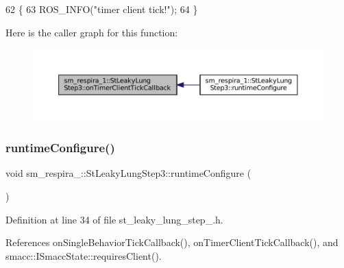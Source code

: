 \begin{DoxyCode}
62     \{
63         ROS\_INFO(\textcolor{stringliteral}{"timer client tick!"});
64     \}
\end{DoxyCode}
Here is the caller graph for this function\+:
\nopagebreak
\begin{figure}[H]
\begin{center}
\leavevmode
\includegraphics[width=350pt]{structsm__respira__1_1_1StLeakyLungStep3_aba1b3c5760856cfc92389b526650a189_icgraph}
\end{center}
\end{figure}
\mbox{\label{structsm__respira__1_1_1StLeakyLungStep3_abea67094aaff8b69c96f478914165c8f}} 
\subsubsection{\texorpdfstring{runtime\+Configure()}{runtimeConfigure()}}
{\footnotesize\ttfamily void sm\+\_\+respira\+\_\+::\+St\+Leaky\+Lung\+Step3\+::runtime\+Configure (\begin{DoxyParamCaption}{ }\end{DoxyParamCaption})\hspace{0.3cm}{\ttfamily [inline]}}



Definition at line 34 of file st\+\_\+leaky\+\_\+lung\+\_\+step\+\_.\+h.



References on\+Single\+Behavior\+Tick\+Callback(), on\+Timer\+Client\+Tick\+Callback(), and smacc\+::\+I\+Smacc\+State\+::requires\+Client().


